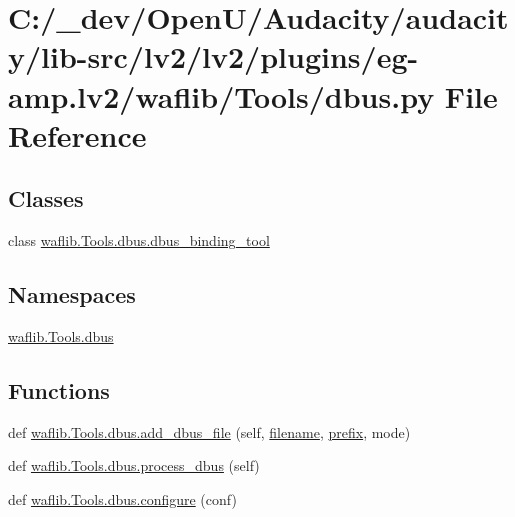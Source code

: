 \hypertarget{lv2_2plugins_2eg-amp_8lv2_2waflib_2_tools_2dbus_8py}{}\section{C\+:/\+\_\+dev/\+Open\+U/\+Audacity/audacity/lib-\/src/lv2/lv2/plugins/eg-\/amp.lv2/waflib/\+Tools/dbus.py File Reference}
\label{lv2_2plugins_2eg-amp_8lv2_2waflib_2_tools_2dbus_8py}
\subsection*{Classes}
\begin{DoxyCompactItemize}
\item 
class \hyperlink{classwaflib_1_1_tools_1_1dbus_1_1dbus__binding__tool}{waflib.\+Tools.\+dbus.\+dbus\+\_\+binding\+\_\+tool}
\end{DoxyCompactItemize}
\subsection*{Namespaces}
\begin{DoxyCompactItemize}
\item 
 \hyperlink{namespacewaflib_1_1_tools_1_1dbus}{waflib.\+Tools.\+dbus}
\end{DoxyCompactItemize}
\subsection*{Functions}
\begin{DoxyCompactItemize}
\item 
def \hyperlink{namespacewaflib_1_1_tools_1_1dbus_a6984c3a3293d830848a5b9e06326a353}{waflib.\+Tools.\+dbus.\+add\+\_\+dbus\+\_\+file} (self, \hyperlink{test__portburn_8cpp_a7efa5e9c7494c7d4586359300221aa5d}{filename}, \hyperlink{structprefix}{prefix}, mode)
\item 
def \hyperlink{namespacewaflib_1_1_tools_1_1dbus_a75dbed39a93f5b22ad67c948e91f2008}{waflib.\+Tools.\+dbus.\+process\+\_\+dbus} (self)
\item 
def \hyperlink{namespacewaflib_1_1_tools_1_1dbus_abce63288e0395b45e8006bd6cc81edb7}{waflib.\+Tools.\+dbus.\+configure} (conf)
\end{DoxyCompactItemize}
